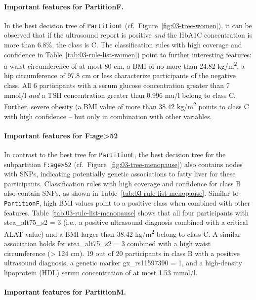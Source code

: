 \documentclass[
  oneside]{book}
\begin{document}
\paragraph*{Important features for PartitionF.}

In the best decision tree of \texttt{PartitionF} (cf.~Figure~\ref{fig:03-tree-women}), it can be observed that if the ultrasound report is positive \emph{and} the HbA1C concentration is more than 6.8\%, the class is C.
The classification rules with high coverage and confidence in Table~\ref{tab:03-rule-list-women}) point to further interesting features:
a waist circumference of at most 80 cm, a BMI of no more than 24.82 kg/m\textsuperscript{2}, a hip circumference of 97.8 cm or less characterize participants of the negative class.
All 6 participants with a serum glucose concentration greater than 7 mmol/l \emph{and} a TSH concentration greater than 0.996 mu/l belong to class C.
Further, severe obesity (a BMI value of more than 38.42 kg/m\textsuperscript{2} points to class C with high confidence -- but only in combination with other variables.

\paragraph*{Important features for F:age>52}

In contrast to the best tree for \texttt{PartitionF}, the best decision tree for the subpartition \texttt{F:age\textgreater{}52} (cf.~Figure~\ref{fig:03-tree-menopause}) also contains nodes with SNPs, indicating potentially genetic associations to fatty liver for these participants.
Classification rules with high coverage and confidence for class B also contain SNPs, as shown in Table~\ref{tab:03-rule-list-menopause}.
Similar to \texttt{PartitionF}, high BMI values point to a positive class when combined with other features.
Table~\ref{tab:03-rule-list-menopause} shows that all four participants with stea\_alt75\_s2 = 3 (i.e., a positive ultrasound diagnosis combined with a critical ALAT value) and a BMI larger than 38.42 kg/m\textsuperscript{2} belong to class C.
A similar association holds for stea\_alt75\_s2 = 3 combined with a high waist circumference (\textgreater{} 124 cm).
19 out of 20 participants in class B with a positive ultrasound diagnosis, a genetic marker gx\_rs11597390 = 1, and a high-density lipoprotein (HDL) serum concentration of at most 1.53 mmol/l.

\paragraph*{Important features for PartitionM.}
\end{document}
